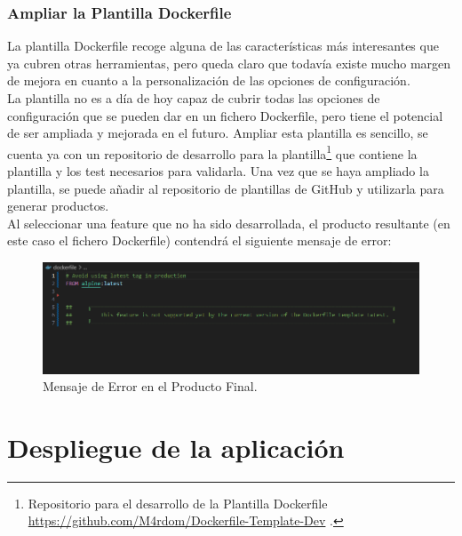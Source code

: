 \documentclass[12pt, a4paper, twoside]{article}
\begin{document}
\subsubsection{Ampliar la Plantilla Dockerfile}
La plantilla Dockerfile recoge alguna de las características más interesantes que ya cubren otras herramientas, pero queda claro que todavía existe mucho margen de mejora en cuanto a la personalización de las opciones de configuración.
\\La plantilla no es a día de hoy capaz de cubrir todas las opciones de configuración que se pueden dar en un fichero Dockerfile, pero tiene el potencial de ser ampliada y mejorada en el futuro.
Ampliar esta plantilla es sencillo, se cuenta ya con un repositorio de desarrollo para la plantilla\footnote{Repositorio para el desarrollo de la Plantilla Dockerfile \url{https://github.com/M4rdom/Dockerfile-Template-Dev} \cite{dockerfile_template_dev}.} que contiene la plantilla y los test necesarios para validarla.
Una vez que se haya ampliado la plantilla, se puede añadir al repositorio de plantillas de GitHub y utilizarla para generar productos.
\\Al seleccionar una feature que no ha sido desarrollada, el producto resultante (en este caso el fichero Dockerfile) contendrá el siguiente mensaje de error:

\begin{figure}[h]
	\centering
	  \includegraphics[width=1\textwidth]{unupportedfeature.png}
	\caption{Mensaje de Error en el Producto Final.}
\end{figure}








\section{Despliegue de la aplicación }
\label{sec:Despliegue de la aplicación}
\end{document}
